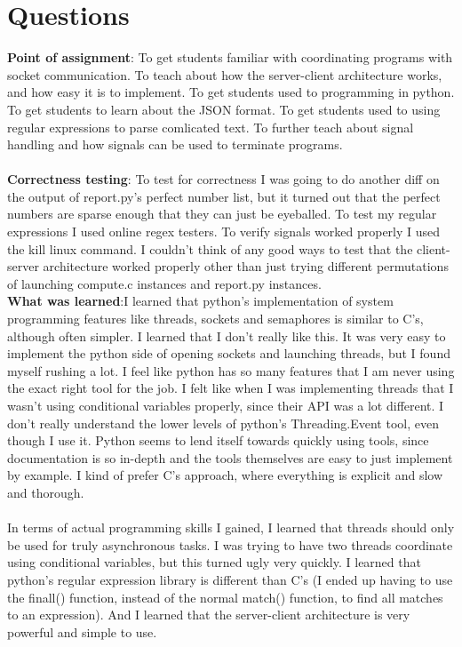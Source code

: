 \documentclass[11pt]{article}
\begin{document}
\section{Questions}
\textbf{Point of assignment}: To get students familiar with coordinating programs with socket communication. To teach about how the server-client architecture works, and how easy it is to implement. To get students used to programming in python. To get students to learn about the JSON format. To get students used to using regular expressions to parse comlicated text. To further teach about signal handling and how signals can be used to terminate programs.\\ \\
\textbf{Correctness testing}: To test for correctness I was going to do another diff on the output of report.py's perfect number list, but it turned out that the perfect numbers are sparse enough that they can just be eyeballed. To test my regular expressions I used online regex testers. To verify signals worked properly I used the kill linux command. I couldn't think of any good ways to test that the client-server architecture worked properly other than just trying different permutations of launching compute.c instances and report.py instances.\\
\textbf{What was learned}:I learned that python's implementation of system programming features like threads, sockets and semaphores is similar to C's, although often simpler. I learned that I don't really like this. It was very easy to implement the python side of opening sockets and launching threads, but I found myself rushing a lot. I feel like python has so many features  that I am never using the exact right tool for the job. I felt like when I was implementing threads that I wasn't using conditional variables properly, since their API was a lot different. I don't really understand the lower levels of python's Threading.Event tool, even though I use it. Python seems to lend itself towards quickly using tools, since documentation is so in-depth and the tools themselves are easy to just implement by example. I kind of prefer C's approach, where everything is explicit and slow and thorough.\\ \\
In terms of actual programming skills I gained, I learned that threads should only be used for truly asynchronous tasks. I was trying to have two threads coordinate using conditional variables, but this turned ugly very quickly. I learned that python's regular expression library is different than C's (I ended up having to use the finall() function, instead of the normal match() function, to find all matches to an expression). And I learned that the server-client architecture is very powerful and simple to use.\\
\end{document}
